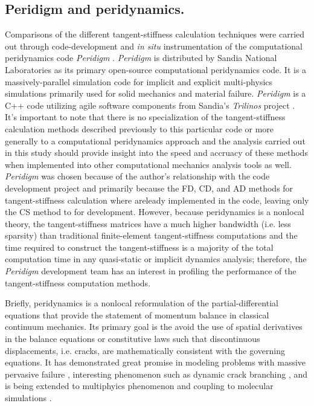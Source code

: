 \documentclass[preprint,12pt]{elsarticle}
\begin{document}
\subsection{Peridigm and  peridynamics.}
%
Comparisons of the different tangent-stiffness calculation techniques were carried out through code-development and \emph{in situ} instrumentation of the computational peridynamics code \emph{Peridigm} \cite{peridigm}. \emph{Peridigm} is distributed by Sandia National Laboratories as its primary open-source computational peridynamics code. It is a massively-parallel simulation code for implicit and explicit multi-physics simulations primarily used for solid mechanics and material failure. \emph{Peridigm} is a C++ code utilizing agile software components from Sandia's  \emph{Trilinos} project \cite{trilinos}. It's important to note that there is no specialization of the tangent-stiffness calculation methods described previously to this particular code or more generally to a computational peridynamics approach and the analysis carried out in this study should provide insight into the speed and accruacy of these methods when implemented into other computational mechanics analysis tools as well.  \emph{Peridigm} was chosen because of the author's relationship with the code development project and primarily because the FD, CD, and AD methods for tangent-stiffness calculation where areleady implemented in the code, leaving only the CS method to for development. However, because peridynamics is a nonlocal theory, the tangent-stiffness matrices have a much higher bandwidth (i.e. less sparsity) than traditional finite-element tangent-stiffness computations and the time required to construct the tangent-stiffness is a majority of the total computation time in any quasi-static or implicit dynamics analysis; therefore, the \emph{Peridigm} development team has an interest in profiling the performance of the tangent-stiffness computation methods.

Briefly, peridynamics \cite{silling2000ret, silling:psa, silling2010peridynamic} is a nonlocal reformulation of the partial-differential equations that provide the statement of momentum balance in classical continuum mechanics. Its primary goal is the avoid the use of spatial derivatives in the balance equations or constitutive laws such that discontinuous displacements, i.e. cracks, are mathematically consistent with the governing equations. It has demonstrated great promise in modeling problems with massive pervasive failure \cite{littlewood2010}, interesting phenomenon such as dynamic crack branching \cite{ha2010sod}, and is being extended to multiphyics phenomenon \cite{bobaru2011peridynamic,katiyar2013} and coupling to molecular simulations \cite{seleson2009peridynamics}.
\end{document}
